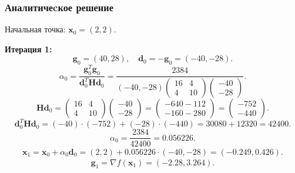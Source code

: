 \documentclass[a4paper,14pt,oneside,openany]{memoir}
\begin{document}
\subsubsection{Аналитичеcкое решение}

Начальная точка: $\mathbf{x}_0 = (2, 2)$.

\textbf{Итерация 1:}
\[
\mathbf{g}_0 = (40, 28), \quad \mathbf{d}_0 = -\mathbf{g}_0 = (-40, -28).
\]
\[
\alpha_0 = \frac{\mathbf{g}_0^T \mathbf{g}_0}{\mathbf{d}_0^T \mathbf{H} \mathbf{d}_0} = \frac{2384}{(-40, -28) \begin{pmatrix} 16 & 4 \\ 4 & 10 \end{pmatrix} \begin{pmatrix} -40 \\ -28 \end{pmatrix}}.
\]
\[
\mathbf{H} \mathbf{d}_0 = \begin{pmatrix} 16 & 4 \\ 4 & 10 \end{pmatrix} \begin{pmatrix} -40 \\ -28 \end{pmatrix} = \begin{pmatrix} -640 - 112 \\ -160 - 280 \end{pmatrix} = \begin{pmatrix} -752 \\ -440 \end{pmatrix}.
\]
\[
\mathbf{d}_0^T \mathbf{H} \mathbf{d}_0 = (-40) \cdot (-752) + (-28) \cdot (-440) = 30080 + 12320 = 42400.
\]
\[
\alpha_0 = \frac{2384}{42400} = 0.056226.
\]
\[
\begin{aligned}
\mathbf{x}_1 = \mathbf{x}_0 + \alpha_0 \mathbf{d}_0 = (2,2) + 0.056226 \cdot (-40, -28)  = (-0.249, 0.426).
\end{aligned}
\]
\[
\mathbf{g}_1 = \nabla f(\mathbf{x}_1) = (-2.28, 3.264).
\]
\end{document}
